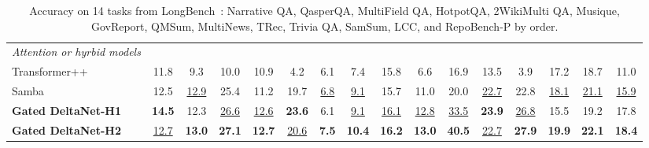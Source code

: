 \documentclass{article}
\begin{document}
\begin{table}[t]
\begin{tabular}{l|ccc|ccc|ccc|ccc|cc|c}
\midrule
\textit{Attention or hyrbid models} \\
Transformer++ & 11.8 & 9.3 & 10.0 & 10.9 & 4.2 & 6.1 & 7.4 & 15.8 & 6.6 & 16.9 & 13.5 & 3.9 & 17.2 & 18.7 & 11.0 \\
Samba & 12.5 & \underline{12.9} & 25.4 & 11.2 & 19.7 & \underline{6.8} & \underline{9.1} & 15.7 & 11.0 & 20.0 & \underline{22.7} & {22.8} & \underline{18.1} & \underline{21.1} & \underline{15.9} \\
\textbf{Gated DeltaNet-H1} & \textbf{14.5} & 12.3 & \underline{26.6} & \underline{12.6} & \textbf{23.6} & 6.1 & \underline{9.1} & \underline{16.1} & \underline{12.8} & \underline{33.5} & \textbf{23.9} & \underline{26.8} & 15.5 & 19.2 & 17.8 \\
\textbf{Gated DeltaNet-H2} & \underline{12.7} & \textbf{13.0} & \textbf{27.1} & \textbf{12.7} & \underline{20.6} & \textbf{7.5} & \textbf{10.4} & \textbf{16.2} & \textbf{13.0} & \textbf{40.5} & \underline{22.7} & \textbf{27.9} & \textbf{19.9} & \textbf{22.1} & \textbf{18.4} \\\bottomrule
\end{tabular}
\caption{Accuracy on 14 tasks from LongBench~\citep{bai2023longbench}: Narrative QA, QasperQA, MultiField QA, HotpotQA, 2WikiMulti QA, Musique, GovReport, QMSum, MultiNews, TRec, Trivia QA, SamSum, LCC, and RepoBench-P by order.
  }
\label{tab:long_bench}
\end{table}
\end{document}
